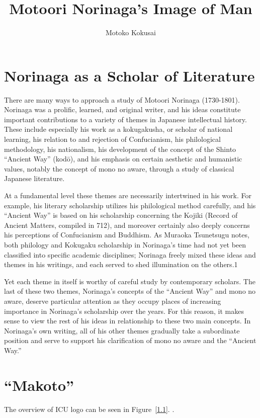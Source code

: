\documentclass[12pt]{report}
\title{Motoori Norinaga’s Image of Man}
\author{Motoko Kokusai}
\date{}
\begin{document}

\doublespacing

\setcounter{tocdepth}{3}
\tableofcontents

\chapter{Norinaga as a Scholar of Literature}\label{intro}
There are many ways to approach a study of Motoori Norinaga (1730-1801). Norinaga was
a prolific, learned, and original writer, and his ideas constitute important contributions to a
variety of themes in Japanese intellectual history. These include especially his work as a
kokugakusha, or scholar of national learning, his relation to and rejection of Confucianism,
his philological methodology, his nationalism, his development of the concept of the Shinto
“Ancient Way” (kodō), and his emphasis on certain aesthetic and humanistic values, notably
the concept of mono no aware, through a study of classical Japanese literature.

At a fundamental level these themes are necessarily intertwined in his work. For
example, his literary scholarship utilizes his philological method carefully, and his “Ancient
Way” is based on his scholarship concerning the Kojiki (Record of Ancient Matters, compiled
in 712), and moreover certainly also deeply concerns his perceptions of Confucianism and
Buddhism. As Muraoka Tsunetsugu notes, both philology and Kokugaku scholarship in
Norinaga’s time had not yet been classified into specific academic disciplines; Norinaga
freely mixed these ideas and themes in his writings, and each served to shed illumination on
the others.1

Yet each theme in itself is worthy of careful study by contemporary scholars. The last of
these two themes, Norinaga’s concepts of the “Ancient Way” and mono no aware, deserve
particular attention as they occupy places of increasing importance in Norinaga’s scholarship
over the years. For this reason, it makes sense to view the rest of his ideas in relationship to
these two main concepts. In Norinaga’s own writing, all of his other themes gradually take
a subordinate position and serve to support his clarification of mono no aware and the
“Ancient Way.”


\chapter{“Makoto”}
The overview of ICU logo can be seen in Figure~\ref{1.1}.
\cite{Ishikawa1984}. 
\end{document}

